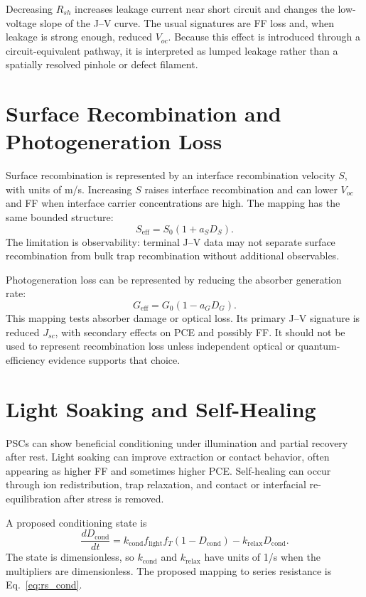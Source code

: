 Decreasing $R_{sh}$ increases leakage current near short circuit and changes
the low-voltage slope of the J--V curve. The usual signatures are FF loss and,
when leakage is strong enough, reduced $V_{oc}$. Because this effect is
introduced through a circuit-equivalent pathway, it is interpreted as lumped
leakage rather than a spatially resolved pinhole or defect filament.

\section{Surface Recombination and Photogeneration Loss}

Surface recombination is represented by an interface recombination velocity
$S$, with units of m/s. Increasing $S$ raises interface recombination and can
lower $V_{oc}$ and FF when interface carrier concentrations are high. The
mapping has the same bounded structure:
\begin{equation}
S_{\mathrm{eff}}=S_0\left(1+a_S D_S\right).
\end{equation}
The limitation is observability: terminal J--V data may not separate surface
recombination from bulk trap recombination without additional observables.

Photogeneration loss can be represented by reducing the absorber generation
rate:
\begin{equation}
G_{\mathrm{eff}}=G_0\left(1-a_GD_G\right).
\end{equation}
This mapping tests absorber damage or optical loss. Its primary J--V signature
is reduced $J_{sc}$, with secondary effects on PCE and possibly FF. It should
not be used to represent recombination loss unless
independent optical or quantum-efficiency evidence supports that choice.

\section{Light Soaking and Self-Healing}

PSCs can show beneficial conditioning under illumination and partial recovery
after rest. Light soaking can improve extraction or contact behavior, often
appearing as higher FF and sometimes higher PCE. Self-healing can occur through
ion redistribution, trap relaxation, and contact or interfacial
re-equilibration after stress is removed.

A proposed conditioning state is
\begin{equation}
\frac{dD_{\mathrm{cond}}}{dt}
= k_{\mathrm{cond}}f_{\mathrm{light}}f_T
\left(1-D_{\mathrm{cond}}\right)
- k_{\mathrm{relax}}D_{\mathrm{cond}}.
\label{eq:dcond}
\end{equation}
The state is dimensionless, so $k_{\mathrm{cond}}$ and $k_{\mathrm{relax}}$
have units of 1/s when the multipliers are dimensionless. The proposed mapping
to series resistance is Eq.~\ref{eq:rs_cond}.

